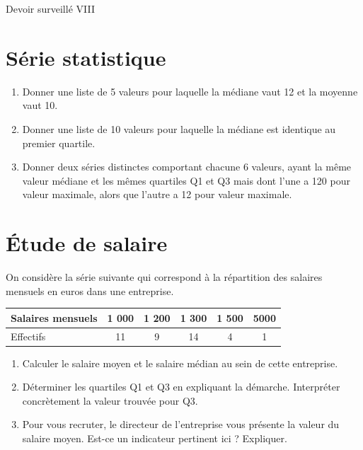 \documentclass[french]{book}
\begin{document}
\newpage 


\begin{center}
\huge{ Devoir surveillé VIII}
\end{center}

\section*{Série statistique}

\begin{enumerate}
\item Donner une liste de 5 valeurs pour laquelle la médiane vaut 12 et la moyenne vaut 10.

\item Donner une liste de 10 valeurs pour laquelle la médiane est identique au premier quartile.
\item Donner deux séries distinctes comportant chacune 6 valeurs, ayant la même valeur médiane et les mêmes quartiles Q1 et Q3 mais dont l’une a 120 pour valeur maximale, alors que l’autre a 12 pour valeur maximale. \\
\end{enumerate}
 
\section*{Étude de salaire}

On considère la série suivante qui correspond à la répartition des salaires mensuels en euros dans une entreprise.

\begin{center}
   \begin{tabular}{| l || c | c | c | c | c |}
     \hline
     Salaires mensuels & 1 000 & 1 200 & 1 300 & 1 500 &  5000 \\ \hline
     Effectifs & 11 & 9 & 14 & 4 & 1 \\ 
     \hline
   \end{tabular}
 \end{center}

\begin{enumerate}
\item Calculer le salaire moyen et le salaire médian au sein de cette entreprise.

\item Déterminer les quartiles Q1 et Q3 en expliquant la démarche.
Interpréter concrètement la valeur trouvée pour Q3.

\item Pour vous recruter, le directeur de l’entreprise vous présente la valeur du salaire moyen. Est-ce un indicateur pertinent ici ? Expliquer.

\end{enumerate}
\end{document}
